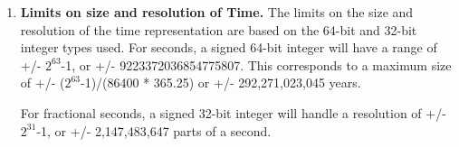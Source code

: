 
\begin{enumerate}

\item {\bf Limits on size and resolution of Time.}  The limits on the size and 
resolution of the time representation are based on the
64-bit and 32-bit integer types used.  For seconds, a signed 64-bit integer
will have a range of +/- $2^{63}$-1, or +/- 9223372036854775807.  This
corresponds to a maximum size of +/- ($2^{63}$-1)/(86400 * 365.25) or
+/- 292,271,023,045 years.

For fractional seconds, a signed 32-bit integer will handle a resolution of
+/- $2^{31}$-1, or +/- 2,147,483,647 parts of a second.

\end{enumerate}
